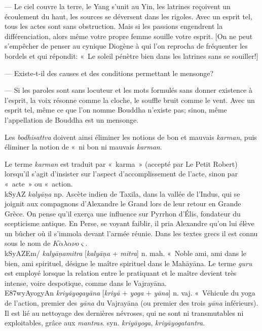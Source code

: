 \documentclass[a4paper,11pt,twocolumn]{article}
\begin{document}
--- Le ciel couvre la terre, le Yang s'unit au Yin, les latrines
re\c{c}oivent un écoulement du haut, les sources se déversent dans les
rigoles. Avec un esprit tel, tous les actes sont sans
obstruction. Mais si les passions engendrent la différenciation, alors
même votre propre femme souille votre esprit. [On ne peut s'empêcher
de penser au cynique Diogène à qui l'on reprocha de fréquenter les
bordels et qui répondit: «~Le soleil pénètre bien dans les latrines
sans se souiller!\fg]

--- Existe-t-il des causes et des conditions permettant le mensonge?

--- Si les paroles sont sans locuteur et les mots formulés sans donner
existence à l'esprit, la voix résonne comme la cloche, le souffle
bruit comme le vent. Avec un esprit tel, même ce que l'on nomme
Bouddha n'existe pas; sinon, même l'appellation de Bouddha est un
mensonge.\fg

Les {\em bodhisattva} doivent ainsi éliminer les notions de bon et
mauvais {\em karman}, puis éliminer la notion de «~ni bon ni mauvais
{\em karman}\fg.

Le terme {\em karman} est
traduit par «~karma~» (accepté par Le Petit Robert) lorsqu'il s'agit
d'insister sur l'aspect d'accomplissement de l'acte, sinon par
«~acte~» ou «~action\fg.\\

{\dn kSyAZ} {\em kaly\={a}\d{n}a} np. Ascète indien de Taxila,
dans la vallée de l'Indus, qui se joignit aux compagnons d'Alexandre
le Grand lors de leur retour en Grande Grèce. On pense qu'il
exer\c{c}a une influence sur Pyrrhon d'Élis, fondateur du scepticisme
antique. En Perse, se voyant faiblir, il pria Alexandre qu'on lui
élève un bûcher où il s'immola devant l'armée réunie. Dans les textes
grecs il est connu sous le nom de $K \acute{\alpha} \lambda \alpha \nu
o \varsigma$.\\

{\dn kSyAZEm/} {\em kaly\={a}\d{n}amitra} [{\em kaly\={a}\d{n}a}
+ {\em mitra}]  n. mah. «~Noble ami, ami dans le bien, ami
spirituel\fg, désigne le maître spirituel dans le Mah\={a}y\={a}na. Le
terme {\em guru} est employé lorsque la relation entre le pratiquant
et le maître devient très intense, voire despotique, comme dans le
Vajray\={a}na. \\

{\dn E\387wyAyogyAn} {\em kriy\={a}yogay\={a}na} [{\em kriy\={a}} +
{\em yoga} + {\em y\={a}na}] n. vaj. «~Véhicule du yoga de l'action\fg,
premier des {\em y\={a}na} du Vajray\={a}na (ou premier des
trois {\em y\={a}na} inférieurs). Il est lié au nettoyage des
dernières névroses, qui ne sont ni transmutables ni exploitables,
grâce aux {\em mantras}. syn. {\em kriy\={a}yoga}, {\em kriy\={a}yogatantra}. \\
\end{document}
